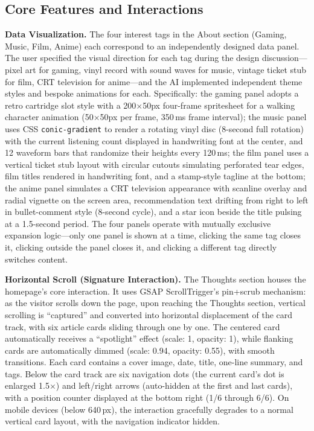 \subsection{Core Features and Interactions}

\textbf{Data Visualization.} The four interest tags in the About section (Gaming, Music, Film, Anime) each correspond to an independently designed data panel. The user specified the visual direction for each tag during the design discussion---pixel art for gaming, vinyl record with sound waves for music, vintage ticket stub for film, CRT television for anime---and the AI implemented independent theme styles and bespoke animations for each. Specifically: the gaming panel adopts a retro cartridge slot style with a 200$\times$50px four-frame spritesheet for a walking character animation (50$\times$50px per frame, 350\,ms frame interval); the music panel uses CSS \texttt{conic-gradient} to render a rotating vinyl disc (8-second full rotation) with the current listening count displayed in handwriting font at the center, and 12 waveform bars that randomize their heights every 120\,ms; the film panel uses a vertical ticket stub layout with circular cutouts simulating perforated tear edges, film titles rendered in handwriting font, and a stamp-style tagline at the bottom; the anime panel simulates a CRT television appearance with scanline overlay and radial vignette on the screen area, recommendation text drifting from right to left in bullet-comment style (8-second cycle), and a star icon beside the title pulsing at a 1.5-second period. The four panels operate with mutually exclusive expansion logic---only one panel is shown at a time, clicking the same tag closes it, clicking outside the panel closes it, and clicking a different tag directly switches content.

\textbf{Horizontal Scroll (Signature Interaction).} The Thoughts section houses the homepage's core interaction. It uses GSAP ScrollTrigger's pin+scrub mechanism: as the visitor scrolls down the page, upon reaching the Thoughts section, vertical scrolling is ``captured'' and converted into horizontal displacement of the card track, with six article cards sliding through one by one. The centered card automatically receives a ``spotlight'' effect (scale: 1, opacity: 1), while flanking cards are automatically dimmed (scale: 0.94, opacity: 0.55), with smooth transitions. Each card contains a cover image, date, title, one-line summary, and tags. Below the card track are six navigation dots (the current card's dot is enlarged 1.5$\times$) and left/right arrows (auto-hidden at the first and last cards), with a position counter displayed at the bottom right (1/6 through 6/6). On mobile devices (below 640\,px), the interaction gracefully degrades to a normal vertical card layout, with the navigation indicator hidden.

